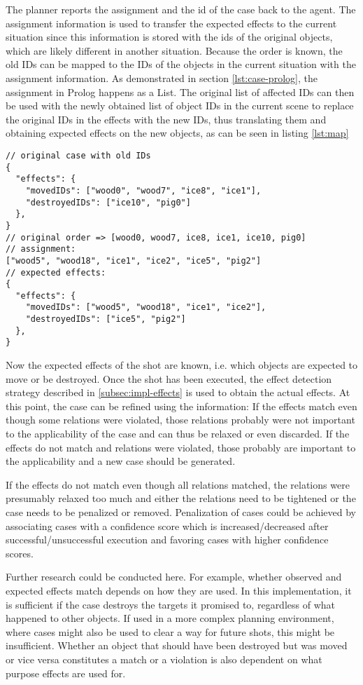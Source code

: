 The planner reports the assignment and the id of the case back to the agent. The assignment information is used to transfer the expected effects to the current situation since this information is stored with the ids of the original objects, which are likely different in another situation.
Because the order is known, the old IDs can be mapped to the IDs of the objects in the current situation with the assignment information. As demonstrated in section \ref{lst:case-prolog}, the assignment in Prolog happens as a List.
The original list of affected IDs can then be used with the newly obtained list of object IDs in the current scene to replace the original IDs in the effects with the new IDs, thus translating them and obtaining expected effects on the new objects, as can be seen in listing \ref{lst:map}

\begin{lstlisting}[label=lst:map, caption=case information outside of Prolog]
// original case with old IDs
{
  "effects": {
    "movedIDs": ["wood0", "wood7", "ice8", "ice1"],
    "destroyedIDs": ["ice10", "pig0"]
  },
}
// original order => [wood0, wood7, ice8, ice1, ice10, pig0]
// assignment:
["wood5", "wood18", "ice1", "ice2", "ice5", "pig2"]
// expected effects:
{
  "effects": {
    "movedIDs": ["wood5", "wood18", "ice1", "ice2"],
    "destroyedIDs": ["ice5", "pig2"]
  },
}
\end{lstlisting}


Now the expected effects of the shot are known, i.e. which objects are expected to move or be destroyed.
Once the shot has been executed, the effect detection strategy described in \ref{subsec:impl-effects} is used to obtain the actual effects.
At this point, the case can be refined using the information: If the effects match even though some relations were violated, those relations probably were not important to the applicability of the case and can thus be relaxed or even discarded.
If the effects do not match and relations were violated, those probably are important to the applicability and a new case should be generated.

If the effects do not match even though all relations matched, the relations were presumably relaxed too much and either the relations need to be tightened or the case needs to be penalized or removed. Penalization of cases could be achieved by associating cases with a confidence score which is increased/decreased after successful/unsuccessful execution and favoring cases with higher confidence scores.


Further research could be conducted here. For example, whether observed and expected effects match depends on how they are used. In this implementation, it is sufficient if the case destroys the targets it promised to, regardless of what happened to other objects.
If used in a more complex planning environment, where cases might also be used to clear a way for future shots, this might be insufficient. Whether an object that should have been destroyed but was moved or vice versa constitutes a match or a violation is also dependent on what purpose effects are used for.